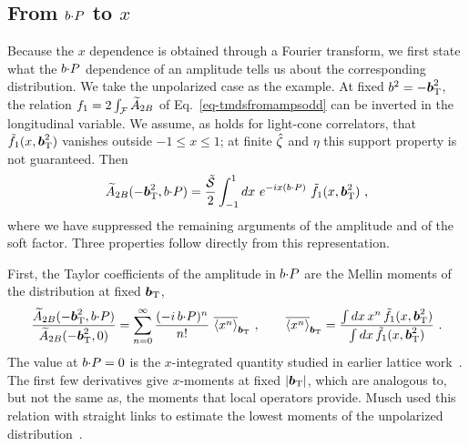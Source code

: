\subsection{From \texorpdfstring{$b{\cdot} P$}{b.P} to \texorpdfstring{$x$}{x}}
\label{sec:bP_to_x}

Because the $x$ dependence is obtained through a Fourier transform, we first state what the $b{\cdot} P$ dependence of an amplitude tells us about the corresponding distribution. We take the unpolarized case as the example. At fixed $b^2 = -\boldsymbol{b}_{\mathrm T}^2$, the relation $f_1 = 2\int_\mathcal{F}\widetilde{A}_{2B}$ of Eq.~\eqref{eq-tmdsfromampsodd} can be inverted in the longitudinal variable. We assume, as holds for light-cone correlators, that $\tilde f_1(x,\boldsymbol{b}_{\mathrm T}^2)$ vanishes outside $-1\le x\le 1$; at finite ${\hat \zeta}$ and $\eta$ this support property is not guaranteed.
Then
\begin{equation}
  \widetilde{A}_{2B}(-\boldsymbol{b}_{\mathrm T}^2,b{\cdot} P) = \frac{\tilde{\mathcal{S}}}{2}\int_{-1}^{1}dx\ e^{-ix(b{\cdot} P)}\ \tilde f_1(x,\boldsymbol{b}_{\mathrm T}^2) \ ,
  \label{eq:amplitude_from_tmd}
\end{equation}
where we have suppressed the remaining arguments of the amplitude and of the soft factor. Three properties follow directly from this representation.

First, the Taylor coefficients of the amplitude in $b{\cdot} P$ are the Mellin moments of the distribution at fixed $\boldsymbol{b}_{\mathrm T}$,
\begin{equation}
  \frac{\widetilde{A}_{2B}(-\boldsymbol{b}_{\mathrm T}^2,b{\cdot} P)}{\widetilde{A}_{2B}(-\boldsymbol{b}_{\mathrm T}^2,0)} = \sum_{n=0}^{\infty}\frac{(-i\,b{\cdot} P)^n}{n!}\ \overline{\langle x^n\rangle}_{\boldsymbol{b}_{\mathrm T}} \ ,\qquad
  \overline{\langle x^n\rangle}_{\boldsymbol{b}_{\mathrm T}} = \frac{\int dx\,x^n\,\tilde f_1(x,\boldsymbol{b}_{\mathrm T}^2)}{\int dx\,\tilde f_1(x,\boldsymbol{b}_{\mathrm T}^2)} \ .
  \label{eq:taylor_moments}
\end{equation}
The value at $b{\cdot} P = 0$ is the $x$-integrated quantity studied in earlier lattice work~\cite{Musch:2011er,Yoon:2017qzo}. The first few derivatives give $x$-moments at fixed $|\boldsymbol{b}_{\mathrm T}|$, which are analogous to, but not the same as, the moments that local operators provide. Musch used this relation with straight links to estimate the lowest moments of the unpolarized distribution~\cite{MuschThesis2}.

